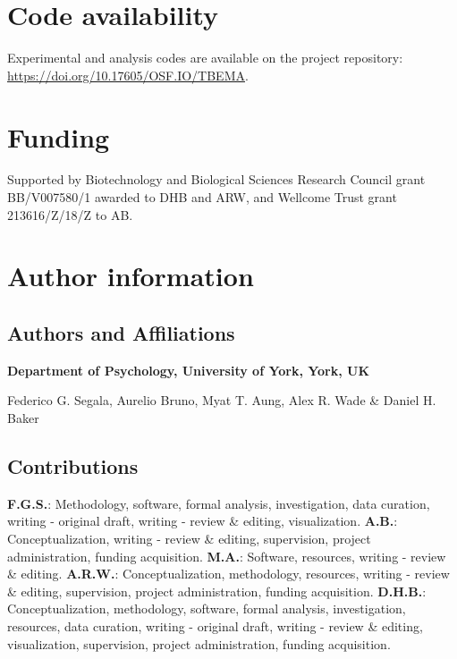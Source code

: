 \documentclass[
]{article}
\begin{document}
\hypertarget{code-availability}{%
\section{Code availability}\label{code-availability}}

Experimental and analysis codes are available on the project repository: \url{https://doi.org/10.17605/OSF.IO/TBEMA}.

\hypertarget{funding}{%
\section{Funding}\label{funding}}

Supported by Biotechnology and Biological Sciences Research Council grant BB/V007580/1 awarded to DHB and ARW, and Wellcome Trust grant 213616/Z/18/Z to AB.

\hypertarget{author-information}{%
\section{Author information}\label{author-information}}

\hypertarget{authors-and-affiliations}{%
\subsection{Authors and Affiliations}\label{authors-and-affiliations}}

\textbf{Department of Psychology, University of York, York, UK}

Federico G. Segala, Aurelio Bruno, Myat T. Aung, Alex R. Wade \& Daniel H. Baker

\hypertarget{contributions}{%
\subsection{Contributions}\label{contributions}}

\textbf{F.G.S.}: Methodology, software, formal analysis, investigation, data curation, writing - original draft, writing - review \& editing, visualization. \textbf{A.B.}: Conceptualization, writing - review \& editing, supervision, project administration, funding acquisition. \textbf{M.A.}: Software, resources, writing - review \& editing. \textbf{A.R.W.}: Conceptualization, methodology, resources, writing - review \& editing, supervision, project administration, funding acquisition. \textbf{D.H.B.}: Conceptualization, methodology, software, formal analysis, investigation, resources, data curation, writing - original draft, writing - review \& editing, visualization, supervision, project administration, funding acquisition.
\end{document}
